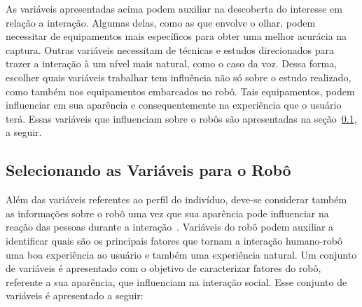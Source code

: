 As variáveis apresentadas acima podem auxiliar na descoberta do interesse em relação a interação. Algumas delas, como as que envolve o olhar, podem necessitar de equipamentos mais específicos para obter uma melhor acurácia na captura. Outras variáveis necessitam de técnicas e estudos direcionados para trazer a interação à um nível mais natural, como o caso da voz. Dessa forma, escolher quais variáveis trabalhar tem influência não só sobre o estudo realizado, como também nos equipamentos embarcados no robô. Tais equipamentos, podem influenciar em sua aparência e consequentemente na experiência que o usuário terá. Essas variáveis que influenciam sobre o robôs são apresentadas na seção~\ref{sec:variaveisrobo}, a seguir.

\subsection{Selecionando as Variáveis para o Robô}
\label{sec:variaveisrobo}
Além das variáveis referentes ao perfil do indivíduo, deve-se considerar também as informações sobre o robô uma vez que sua aparência pode influenciar na reação das pessoas durante a interação~\cite{hegel:2009}. Variáveis do robô podem auxiliar a identificar quais são os principais fatores que tornam a interação humano-robô uma boa experiência ao usuário e também uma experiência natural. Um conjunto de variáveis é apresentado com o objetivo de caracterizar fatores do robô, referente a sua aparência, que influenciam na interação social. Esse conjunto de variáveis é apresentado a seguir:

